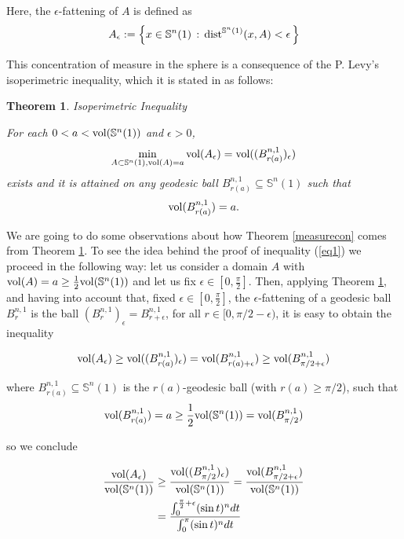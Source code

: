 \documentclass{amsart}
\newtheorem{theorem}{Theorem}[section]
\theoremstyle{definition}
\theoremstyle{remark}
\begin{document}
Here, the $\epsilon$-fattening of $A$ is defined as
$$A_\epsilon:=\left\{x\in \mathbb{S}^n(1)\, :\, {\rm dist}^{\mathbb{S}^n(1)}(x,A)<\epsilon\, \right\}
$$
 
 This concentration of measure in the sphere is a consequence of the P. Levy's isoperimetric inequality,  which it is stated in \cite{MS} as follows:

 \begin{theorem}{ Isoperimetric Inequality}\label{isopineq}
 \medskip
 
For each $0<a<{\rm vol}(\mathbb{S}^n(1))$ and $\epsilon >0$,
$$
\min_{A\subset \mathbb{S}^n(1), {\rm vol}(A)=a}{\rm vol}(A_\epsilon)= {\rm vol}((B^{n,1}_{r(a)})_\epsilon)
$$
exists and it  is attained on any geodesic ball $B^{n,1}_{r(a)} \subseteq \mathbb{S}^n(1)$ such that
$$
{\rm vol}(B^{n,1}_{r(a)})=a.
$$
\end{theorem}


  We are going to do some observations about how Theorem \ref{measurecon} comes from Theorem \ref{isopineq}. To see the idea behind  the proof of inequality (\ref{eq1}) we proceed in the following way: let us consider a  domain $A$ with ${\rm vol }(A)=a \geq \frac{1}{2} {\rm vol}(\mathbb{S}^n(1))$ and let us fix $\epsilon \in [0,\frac{\pi}{2}]$. Then,  applying Theorem \ref{isopineq}, and having into account that, fixed $\epsilon \in [0,\frac{\pi}{2}]$, the $\epsilon$-fattening of a geodesic ball $B^{n,1}_{r}$ is the ball $(B^{n,1}_{r})_{\epsilon}=B^{n,1}_{r+\epsilon}$, for all $r \in [0,\pi/2-\epsilon)$, it is easy to obtain the inequality
  
  $${\rm vol}(A_\epsilon) \geq {\rm vol}((B^{n,1}_{r(a)})_\epsilon)= {\rm vol}(B^{n,1}_{r(a)+\epsilon})\geq  {\rm vol}(B^{n,1}_{\pi/2+\epsilon})$$
  
\noindent where $B^{n,1}_{r(a)} \subseteq \mathbb{S}^n(1)$ is the $r(a)$-geodesic ball (with $r(a) \geq \pi/2$), such that
$$
{\rm vol}(B^{n,1}_{r(a)})=a \geq \frac{1}{2} {\rm vol}(\mathbb{S}^n(1))= {\rm vol}(B^{n,1}_{\pi/2})
$$

\noindent so we conclude


$$
\begin{aligned}
\frac{{\rm vol}(A_\epsilon)}{{\rm vol}(\mathbb{S}^n(1))}&\geq \frac{{\rm vol}((B^{n,1}_{\pi/2})_\epsilon)}{{\rm vol}(\mathbb{S}^n(1))}= \frac{{\rm vol}(B^{n,1}_{\pi/2+\epsilon})}{{\rm vol}(\mathbb{S}^n(1))}\\&= \frac{\int _0^{\frac{\pi}{2}+\epsilon} (\sin t)^n dt }{\int _0^\pi (\sin t)^n dt   }
\end{aligned}
$$
\end{document}
